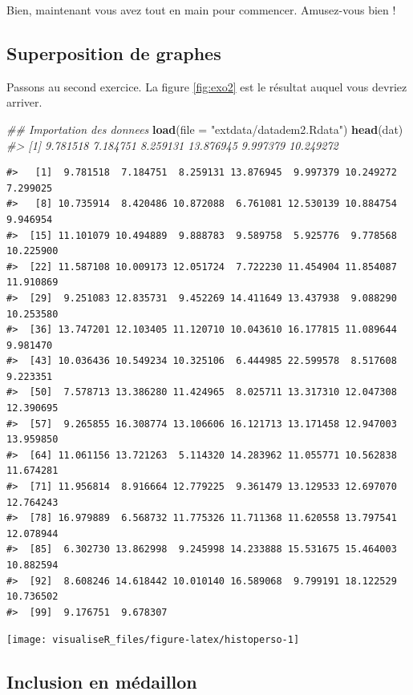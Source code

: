 \documentclass[]{article}
\newenvironment{Shaded}{\begin{snugshade}}{\end{snugshade}}
\newcommand{\CommentTok}[1]{\textcolor[rgb]{0.56,0.35,0.01}{\textit{#1}}}
\newcommand{\DataTypeTok}[1]{\textcolor[rgb]{0.13,0.29,0.53}{#1}}
\newcommand{\KeywordTok}[1]{\textcolor[rgb]{0.13,0.29,0.53}{\textbf{#1}}}
\newcommand{\NormalTok}[1]{#1}
\newcommand{\StringTok}[1]{\textcolor[rgb]{0.31,0.60,0.02}{#1}}
\begin{document}
Bien, maintenant vous avez tout en main pour commencer. Amusez-vous bien !

\hypertarget{superposition-de-graphes}{%
\subsection{Superposition de graphes}\label{superposition-de-graphes}}

Passons au second exercice. La figure \ref{fig:exo2} est le résultat auquel vous devriez arriver.

\begin{Shaded}
\begin{Highlighting}[]
\CommentTok{## Importation des donnees}
\KeywordTok{load}\NormalTok{(}\DataTypeTok{file =} \StringTok{"extdata/datadem2.Rdata"}\NormalTok{)}
\KeywordTok{head}\NormalTok{(dat)}
\CommentTok{#> [1]  9.781518  7.184751  8.259131 13.876945  9.997379 10.249272}
\end{Highlighting}
\end{Shaded}

\begin{verbatim}
#>   [1]  9.781518  7.184751  8.259131 13.876945  9.997379 10.249272  7.299025
#>   [8] 10.735914  8.420486 10.872088  6.761081 12.530139 10.884754  9.946954
#>  [15] 11.101079 10.494889  9.888783  9.589758  5.925776  9.778568 10.225900
#>  [22] 11.587108 10.009173 12.051724  7.722230 11.454904 11.854087 11.910869
#>  [29]  9.251083 12.835731  9.452269 14.411649 13.437938  9.088290 10.253580
#>  [36] 13.747201 12.103405 11.120710 10.043610 16.177815 11.089644  9.981470
#>  [43] 10.036436 10.549234 10.325106  6.444985 22.599578  8.517608  9.223351
#>  [50]  7.578713 13.386280 11.424965  8.025711 13.317310 12.047308 12.390695
#>  [57]  9.265855 16.308774 13.106606 16.121713 13.171458 12.947003 13.959850
#>  [64] 11.061156 13.721263  5.114320 14.283962 11.055771 10.562838 11.674281
#>  [71] 11.956814  8.916664 12.779225  9.361479 13.129533 12.697070 12.764243
#>  [78] 16.979889  6.568732 11.775326 11.711368 11.620558 13.797541 12.078944
#>  [85]  6.302730 13.862998  9.245998 14.233888 15.531675 15.464003 10.882594
#>  [92]  8.608246 14.618442 10.010140 16.589068  9.799191 18.122529 10.736502
#>  [99]  9.176751  9.678307
\end{verbatim}

\begin{center}\texttt{[image: visualiseR\_files/figure-latex/histoperso-1]} \end{center}

\hypertarget{inclusion-en-muxe9daillon}{%
\subsection{Inclusion en médaillon}\label{inclusion-en-muxe9daillon}}
\end{document}
